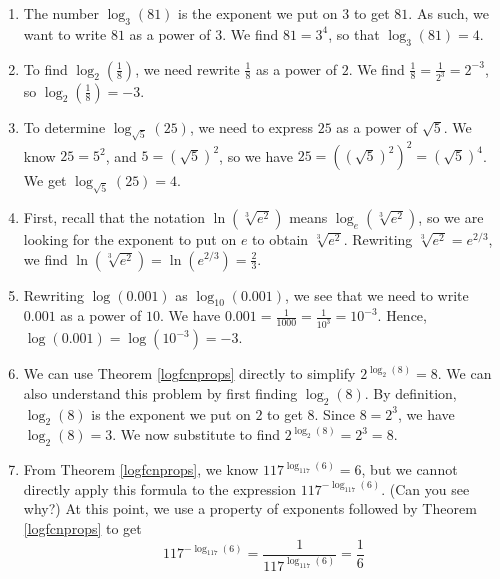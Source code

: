 {
\begin{enumerate}

\item The number $\log_{3}(81)$ is the exponent we put on $3$ to get $81$.  As such, we want to write $81$ as a power of $3$.  We find $81 = 3^{4}$, so that $\log_{3}(81)=4$.

\item To find $\log_{2}\left(\frac{1}{8}\right)$, we need rewrite $\frac{1}{8}$ as a power of $2$.  We find $\frac{1}{8} = \frac{1}{2^{3}} = 2^{-3}$, so $\log_{2}\left(\frac{1}{8}\right) = -3$.

\item To determine $\log_{\sqrt{5}}(25)$, we need to express $25$ as a power of $\sqrt{5}$.  We know $25 = 5^2$, and $5 = \left(\sqrt{5}\right)^2$, so we have $25 = \left(\left(\sqrt{5}\right)^2\right)^2 = \left(\sqrt{5}\right)^4$.  We get $\log_{\sqrt{5}}(25) = 4$.

\item  First, recall that the notation  $\ln\left(\sqrt[3]{e^2}\right)$ means $\log_{e}\left(\sqrt[3]{e^2}\right)$, so we are looking for the exponent to put on $e$ to obtain $\sqrt[3]{e^2}$.  Rewriting $\sqrt[3]{e^2} = e^{2/3}$, we find  $\ln\left(\sqrt[3]{e^2}\right) =  \ln\left(e^{2/3}\right) = \frac{2}{3}$.

\item  Rewriting $\log(0.001)$ as $\log_{10} (0.001)$, we see that we need to write $0.001$ as a power of $10$.  We have $0.001 = \frac{1}{1000} = \frac{1}{10^3} = 10^{-3}$.  Hence, $\log(0.001) = \log\left(10^{-3}\right) = -3$.

\item  We can use Theorem \ref{logfcnprops} directly to simplify  $2^{\log_{2}(8)} = 8$. We can also understand this problem by first finding $\log_{2}(8)$.  By definition, $\log_{2}(8)$ is the exponent we put on $2$ to get $8$.  Since $8 = 2^3$, we have $\log_{2}(8) = 3$.  We now substitute to find $2^{\log_{2}(8)} = 2^3 = 8$.

\item  From Theorem \ref{logfcnprops}, we know $117^{\log_{117}(6)}=6$,  but we cannot directly apply this formula to the expression $117^{-\log_{117}(6)}$.  (Can you see why?) At this point, we use a property of exponents followed by Theorem \ref{logfcnprops} to get
\enlargethispage{\baselineskip}   \[117^{-\log_{117}(6)} = \frac{1}{117^{\log_{117}(6)}} = \frac{1}{6}\]   
 
\end{enumerate}
}

